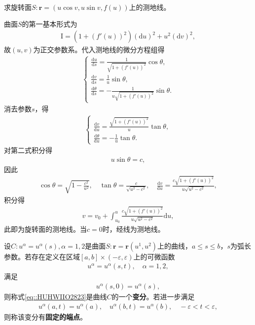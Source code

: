 \documentclass[../../main.tex]{subfiles}%
\begin{document}
\begin{example}
求旋转面$S:\boldsymbol{r}=(u\cos v,u\sin v,f(u))$上的测地线。
\end{example}
\begin{solution}
曲面$S$的第一基本形式为
\begin{align}
\mathrm{I}=(1+(f'(u))^2)(\mathrm{d}u)^2+u^2(\mathrm{d}v)^2,
\end{align}
故$(u,v)$为正交参数系。代入测地线的微分方程组得
\begin{align}
\begin{cases}
\frac{\mathrm{d}u}{\mathrm{d}s}=\frac{1}{\sqrt{1+(f'(u))^2}}\cos\theta,\\
\frac{\mathrm{d}v}{\mathrm{d}s}=\frac{1}{u}\sin\theta,\\
\frac{\mathrm{d}\theta}{\mathrm{d}s}=-\frac{1}{u\sqrt{1+(f'(u))^2}}\sin\theta.
\end{cases}
\end{align}
消去参数$s$，得
\begin{align}
\begin{cases}
\frac{\mathrm{d}v}{\mathrm{d}u}=\frac{\sqrt{1+(f'(u))^2}}{u}\tan\theta,\\
\frac{\mathrm{d}\theta}{\mathrm{d}u}=-\frac{1}{u}\tan\theta.
\end{cases}
\end{align}
对第二式积分得
\begin{align}
u\sin\theta=c,
\end{align}
因此
\begin{align*}
\cos\theta=\sqrt{1-\frac{c^2}{u^2}},\quad \tan\theta=\frac{c}{\sqrt{u^2-c^2}},\quad \frac{\mathrm{d}v}{\mathrm{d}u}=\frac{c\sqrt{1+(f'(u))^2}}{u\sqrt{u^2-c^2}},
\end{align*}
积分得
\begin{align}
v=v_0+\int_{u_0}^{u}\frac{c\sqrt{1+(f'(u))^2}}{u\sqrt{u^2-c^2}}\mathrm{d}u,
\end{align}
此即为旋转面的测地线。当$c=0$时，经线为测地线。

\end{solution}

\begin{definition}
设$C:u^\alpha=u^\alpha(s),\alpha=1,2$是曲面$S:\boldsymbol{r}=\boldsymbol{r}(u^1,u^2)$上的曲线，$a\leqslant s\leqslant b$，$s$为弧长参数。若存在定义在区域$[a,b]\times(-\varepsilon,\varepsilon)$上的可微函数
\begin{align}\label{eq::HUHWIIO2823}
u^\alpha=u^\alpha(s,t),\quad \alpha=1,2,
\end{align}
满足
\begin{align}
u^\alpha(s,0)=u^\alpha(s),
\end{align}
则称式\eqref{eq::HUHWIIO2823}是曲线$C$的一个\textbf{变分}。若进一步满足
\begin{align}
u^\alpha(a,t)=u^\alpha(a),\quad u^\alpha(b,t)=u^\alpha(b),\quad -\varepsilon<t<\varepsilon,
\end{align}
则称该变分有\textbf{固定的端点}。
\end{definition}
\end{document}
